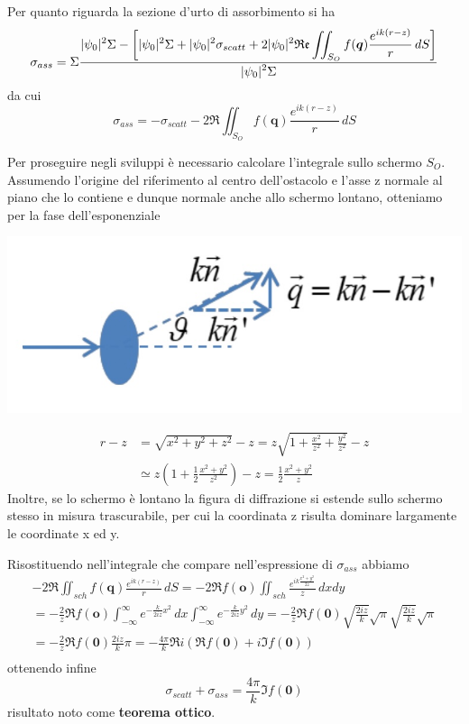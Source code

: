Per quanto riguarda la sezione d'urto di assorbimento si ha
\[
	\sigma_{ass} = \Sigma   \fraclarg{|\psi_0|^2 \Sigma - \left[ |\psi_0|^2 \Sigma + |\psi_0|^2 \sigma_{scatt} +  2 |\psi_0|^2 \Re \iint_{S_O} f(\bm{q})\frac{e^{ik(r-z)}}{r} \,dS \right]}{|\psi_0|^2 \Sigma}
\] da cui
\begin{equation}
	\sigma_{ass} = - \sigma_{scatt} -  2  \Re \iint_{S_O} f(\bm{q})\frac{e^{ik(r-z)}}{r} \,dS
\end{equation}

Per proseguire negli sviluppi è necessario calcolare l'integrale sullo schermo $S_O$.
Assumendo l'origine del riferimento al centro dell'ostacolo e l'asse z normale al piano che lo contiene e dunque normale anche allo schermo lontano, otteniamo per la fase dell'esponenziale

\begin{marginfigure}
	\centering
	\includegraphics[width = 1.25 \textwidth, height = 1.25 \textheight]{figs/schema-vett-trasferito}
	\label{fig:vett-trasferito}
\end{marginfigure}

\begin{align*}
	r - z & = \sqrt{x^2 + y^2+z^2} -z = z\sqrt{1 + \frac{x^2}{z^2}+\frac{y^2}{z^2}} -z                       \\
	      & \simeq z \left( 1 + \frac{1}{2}\frac{x^2 + y^2}{z^2}\right) -z  = \frac{1}{2}\frac{x^2 + y^2}{z}
\end{align*} Inoltre, se lo schermo è lontano la figura di diffrazione si estende sullo schermo stesso in misura trascurabile, per cui la coordinata z risulta dominare largamente le coordinate x ed y.

Risostituendo nell'integrale che compare nell'espressione di $\sigma_{ass}$ abbiamo \begin{gather*}
	- 2 \Re\iint_{sch}f(\bm{q})\frac{e^{ik(r-z)}}{r} \, dS =
	- 2 \Re f(\bm{o}) \iint_{sch}\frac{e^{ik \frac{x^2 + y^2}{2z}}}{z} \, dxdy\\
	= - \frac{2}{z} \Re f(\bm{o}) \int_{- \infty}^{\infty} e ^{- \frac{k}{2iz}x^2} \, dx
	\int_{- \infty}^{\infty} e ^{- \frac{k}{2iz}y^2} \, dy = - \frac{2}{z} \Re f(\bm{0}) \sqrt{\frac{2iz}{k}}\sqrt{\pi}\sqrt{\frac{2iz}{k}}\sqrt{\pi}\\
	= - \frac{2}{z} \Re f(\bm{0}) \frac{2iz}{k}\pi = - \frac{4 \pi}{k} \Re i (\Re f(\bm{0}) + i  \Im f(\bm{0}))\\
\end{gather*} ottenendo infine \[
	\boxed{\sigma_{scatt} + \sigma_{ass} = \frac{4 \pi}{k} \Im f(\bm{0})}
\] risultato noto come \textbf{teorema ottico}.

